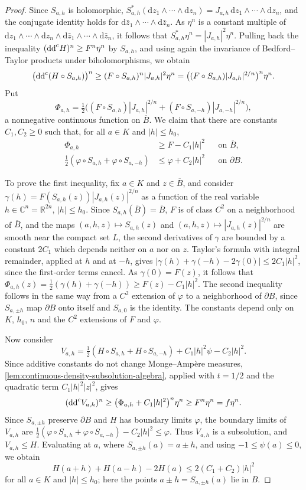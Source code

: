 \begin{proof}
Since $S_{a,h}$ is holomorphic, $S_{a,h}^*(\mathrm dz_1\wedge\cdots\wedge\mathrm dz_n)=J_{a,h}\,\mathrm dz_1\wedge\cdots\wedge\mathrm dz_n$, and the conjugate identity holds for $\mathrm d\bar z_1\wedge\cdots\wedge\mathrm d\bar z_n$. As $\eta^n$ is a constant multiple of $\mathrm dz_1\wedge\cdots\wedge\mathrm dz_n\wedge\mathrm d\bar z_1\wedge\cdots\wedge\mathrm d\bar z_n$, it follows that $S_{a,h}^*\eta^n=|J_{a,h}|^2\eta^n$. Pulling back the inequality $(\mathrm{dd}^{\mathrm{c}} H)^n\ge F^n\eta^n$ by $S_{a,h}$, and using again the invariance of Bedford--Taylor products under biholomorphisms, we obtain
\[
 \bigl(\mathrm{dd}^{\mathrm{c}}(H\circ S_{a,h})\bigr)^n
 \ge (F\circ S_{a,h})^n|J_{a,h}|^2\eta^n
 =\bigl((F\circ S_{a,h})|J_{a,h}|^{2/n}\bigr)^n\eta^n.
\]
Put
\[
 \Phi_{a,h}=\tfrac12\bigl((F\circ S_{a,h})|J_{a,h}|^{2/n}
 +(F\circ S_{a,-h})|J_{a,-h}|^{2/n}\bigr),
\]
a nonnegative continuous function on $\overline B$. We claim that there are constants $C_1,C_2\ge0$ such that, for all $a\in K$ and $|h|\le h_0$,
\[
 \begin{aligned}
 \Phi_{a,h}&\ge F-C_1|h|^2 &&\text{on }\overline B,\\
 \tfrac12(\varphi\circ S_{a,h}+\varphi\circ S_{a,-h})
 &\le\varphi+C_2|h|^2 &&\text{on }\partial B.
 \end{aligned}
\]

To prove the first inequality, fix $a\in K$ and $z\in\overline B$, and consider $\gamma(h)=F(S_{a,h}(z))|J_{a,h}(z)|^{2/n}$ as a function of the real variable $h\in\mathbb C^n=\mathbb R^{2n}$, $|h|\le h_0$. Since $S_{a,h}(\overline B)=\overline B$, $F$ is of class $C^2$ on a neighborhood of $\overline B$, and the maps $(a,h,z)\mapsto S_{a,h}(z)$ and $(a,h,z)\mapsto|J_{a,h}(z)|^{2/n}$ are smooth near the compact set $L$, the second derivatives of $\gamma$ are bounded by a constant $2C_1$ which depends neither on $a$ nor on $z$. Taylor's formula with integral remainder, applied at $h$ and at $-h$, gives $|\gamma(h)+\gamma(-h)-2\gamma(0)|\le2C_1|h|^2$, since the first-order terms cancel. As $\gamma(0)=F(z)$, it follows that $\Phi_{a,h}(z)=\frac12(\gamma(h)+\gamma(-h))\ge F(z)-C_1|h|^2$. The second inequality follows in the same way from a $C^2$ extension of $\varphi$ to a neighborhood of $\partial B$, since $S_{a,\pm h}$ map $\partial B$ onto itself and $S_{a,0}$ is the identity. The constants depend only on $K$, $h_0$, $n$ and the $C^2$ extensions of $F$ and $\varphi$.

Now consider
\[
 V_{a,h}=\tfrac12(H\circ S_{a,h}+H\circ S_{a,-h})
            +C_1|h|^2\psi-C_2|h|^2.
\]
Since additive constants do not change Monge--Amp\`ere measures, \cref{lem:continuous-density-subsolution-algebra}, applied with $t=1/2$ and the quadratic term $C_1|h|^2|z|^2$, gives
\[
 (\mathrm{dd}^{\mathrm{c}} V_{a,h})^n\ge\bigl(\Phi_{a,h}+C_1|h|^2\bigr)^n\eta^n\ge F^n\eta^n=f\eta^n.
\]
Since $S_{a,\pm h}$ preserve $\partial B$ and $H$ has boundary limits $\varphi$, the boundary limits of $V_{a,h}$ are $\frac12(\varphi\circ S_{a,h}+\varphi\circ S_{a,-h})-C_2|h|^2\le\varphi$. Thus $V_{a,h}$ is a subsolution, and $V_{a,h}\le H$. Evaluating at $a$, where $S_{a,\pm h}(a)=a\pm h$, and using $-1\le\psi(a)\le0$, we obtain
\[
 H(a+h)+H(a-h)-2H(a)\le2(C_1+C_2)|h|^2
\]
for all $a\in K$ and $|h|\le h_0$; here the points $a\pm h=S_{a,\pm h}(a)$ lie in $B$.


\end{proof}

